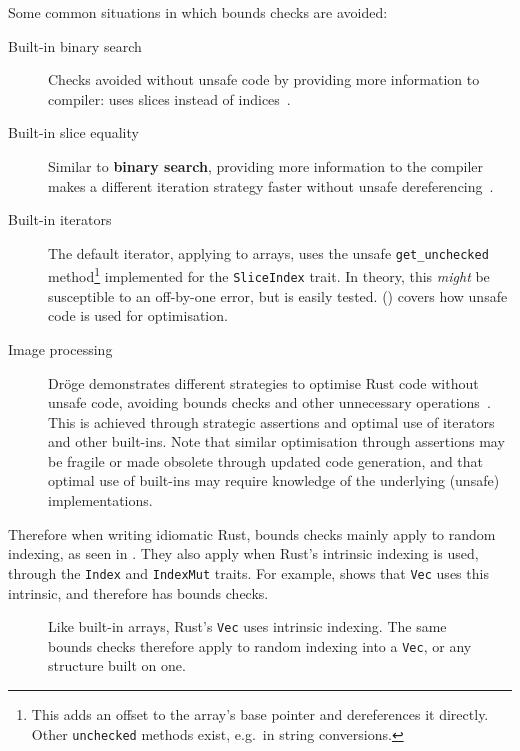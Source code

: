 \documentclass[dissertation.tex]{subfiles}
\begin{document}
Some common situations in which bounds checks are avoided:

\begin{description}
    \item[Built-in binary search] Checks avoided without unsafe code by
    providing more information to compiler: uses slices instead of
    indices~\cite{rust-pr-binarysearch}.
    \item[Built-in slice equality] Similar to \textbf{binary search},
    providing more information to the compiler makes a different
    iteration strategy faster without unsafe dereferencing~\cite{rust-pr-slice-partialeq}.
    \item[Built-in iterators] The default iterator, applying to arrays,
    uses the unsafe \texttt{get\_unchecked} method\footnote{This adds an
    offset to the array's base pointer and dereferences it directly.
    Other \texttt{unchecked} methods exist, e.g.\ in string
    conversions.} implemented for the \texttt{SliceIndex} trait.
    In theory, this \emph{might} be susceptible to an off-by-one error,
    but is easily tested.
    ()
     covers how unsafe code is used for optimisation.
    \item[Image processing] Dr\"oge demonstrates different strategies to
    optimise Rust code without unsafe code, avoiding bounds checks and
    other unnecessary operations~\cite{droge-opt}.
    This is achieved through strategic assertions and optimal use of
    iterators and other built-ins.
    Note that similar optimisation through assertions may be fragile or
    made obsolete through updated code generation, and that optimal use
    of built-ins may require knowledge of the underlying (unsafe)
    implementations.
\end{description}

Therefore when writing idiomatic Rust, bounds checks mainly apply to
random indexing, as seen in .
They also apply when Rust's intrinsic indexing is used, through the
\texttt{Index} and \texttt{IndexMut} traits.
For example,  shows that \texttt{Vec} uses
this intrinsic, and therefore has bounds checks.

\begin{figure}[ht]
    
    \caption{
        Like built-in arrays, Rust's \texttt{Vec} uses intrinsic
        indexing.
        The same bounds checks therefore apply to random indexing into a
        \texttt{Vec}, or any structure built on one.
    }
    \label{lst:rust-vec-index}
\end{figure}
\end{document}
